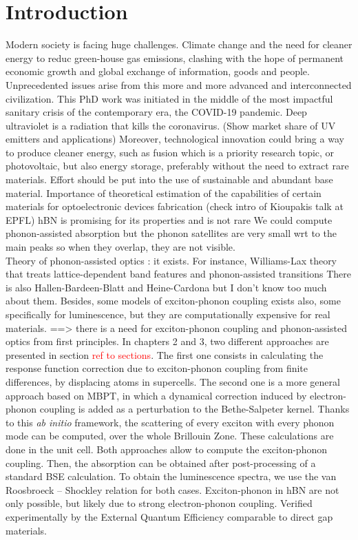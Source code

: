 \chapter*{Introduction}
Modern society is facing huge challenges. Climate change and the need for cleaner energy to reduc green-house gas emissions, clashing with the hope of permanent economic growth and global exchange of information, goods and people. Unprecedented issues arise from this more and more advanced and interconnected civilization. This PhD work was initiated in the middle of the most impactful sanitary crisis of the contemporary era, the COVID-19 pandemic. 
Deep ultraviolet is a radiation that kills the coronavirus. (Show market share of UV emitters and applications)
Moreover, technological innovation could bring a way to produce cleaner energy, such as fusion which is a priority research topic, or photovoltaic, but also energy storage, preferably without the need to extract rare materials. Effort should be put into the use of sustainable and abundant base material.
Importance of theoretical estimation of the capabilities of certain materials for optoelectronic devices fabrication (check intro of Kioupakis talk at EPFL)
hBN is promising for its properties and is not rare
We could compute phonon-assisted absorption but the phonon satellites are very small wrt to the main peaks so when they overlap, they are not visible.\\
Theory of phonon-assisted optics : it exists. For instance, Williams-Lax theory that treats lattice-dependent band features and phonon-assisted transitions 
There is also Hallen-Bardeen-Blatt and Heine-Cardona but I don't know too much about them.
Besides, some models of exciton-phonon coupling exists also, some specifically for luminescence, but they are computationally expensive for real materials.
==> there is a need for exciton-phonon coupling and phonon-assisted optics from first principles. In chapters 2 and 3, two different approaches are presented in section \textcolor{red}{ref to sections}. The first one consists in calculating the response function correction due to exciton-phonon coupling from finite differences, by displacing atoms in supercells. The second one is a more general approach based on \acrshort{MBPT}, in which a dynamical correction induced by electron-phonon coupling is added as a perturbation to the Bethe-Salpeter kernel. Thanks to this \textit{ab initio} framework, the scattering of every exciton with every phonon mode can be computed, over the whole Brillouin Zone. These calculations are done in the unit cell.
Both approaches allow to compute the exciton-phonon coupling. Then, the absorption can be obtained after post-processing of a standard \acrshort{BSE} calculation. To obtain the luminescence spectra, we use the van Roosbroeck -- Shockley relation for both cases.
Exciton-phonon in hBN are not only possible, but likely due to strong electron-phonon coupling. Verified experimentally by the External Quantum Efficiency comparable to direct gap materials.\\

